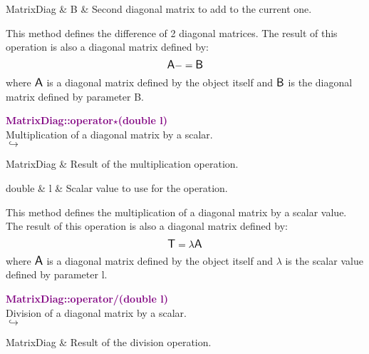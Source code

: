 \begin{tcolorbox}[width=\textwidth,myArgs,tabularx={ll|R}]
MatrixDiag & B & Second diagonal matrix to add to the current one.
\end{tcolorbox}

This method defines the difference of 2 diagonal matrices.
The result of this operation is also a diagonal matrix defined by:
\begin{equation*}
\mbox{\large\ensuremath{\mathsf{A}}} -= \mbox{\large\ensuremath{\mathsf{B}}}
\end{equation*}
where $\mbox{\large\ensuremath{\mathsf{A}}}$ is a diagonal matrix defined by the object itself and $\mbox{\large\ensuremath{\mathsf{B}}}$ is the diagonal matrix defined by parameter B.

\textcolor{purple}{\textbf{MatrixDiag::operator$\star$(double l)}}\label{MatrixDiag::operator*(double l)}\\
Multiplication of a diagonal matrix by a scalar.\\ \hspace*{5mm}$\hookrightarrow$
\vspace*{-2em}\begin{tcolorbox}[grow to left by=-1cm, width=\textwidth-1cm,myArgs,tabularx={l|R}]
MatrixDiag & Result of the multiplication operation.
\end{tcolorbox}

\begin{tcolorbox}[width=\textwidth,myArgs,tabularx={ll|R}]
double & l & Scalar value to use for the operation.
\end{tcolorbox}

This method defines the multiplication of a diagonal matrix by a scalar value.
The result of this operation is also a diagonal matrix defined by:
\begin{equation*}
\mbox{\large\ensuremath{\mathsf{T}}} = \lambda \mbox{\large\ensuremath{\mathsf{A}}}
\end{equation*}
where $\mbox{\large\ensuremath{\mathsf{A}}}$ is a diagonal matrix defined by the object itself and $\lambda$ is the scalar value defined by parameter l.

\textcolor{purple}{\textbf{MatrixDiag::operator/(double l)}}\label{MatrixDiag::operator/(double l)}\\
Division of a diagonal matrix by a scalar.\\ \hspace*{5mm}$\hookrightarrow$
\vspace*{-2em}\begin{tcolorbox}[grow to left by=-1cm, width=\textwidth-1cm,myArgs,tabularx={l|R}]
MatrixDiag & Result of the division operation.
\end{tcolorbox}


